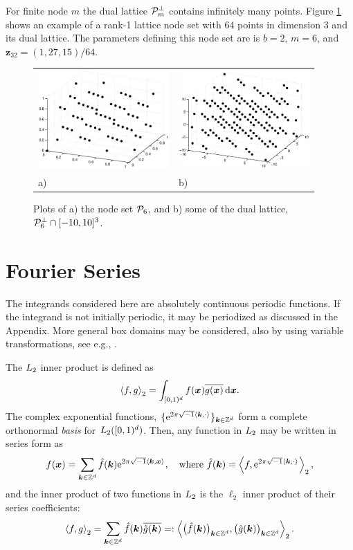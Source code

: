 \documentclass[graybox]{svmult}
\newcommand{\Z}{\mathbb{Z}} %
\newcommand{\bsx}{\boldsymbol{x}}    %
\newcommand{\bsz}{\boldsymbol{z}}    %
\begin{document}
For finite node $m$ the dual lattice $\mathcal{P}^{\perp}_{m}$ contains infinitely many points. Figure \ref{Latticefig} shows an example of a rank-1 lattice node set with $64$ points in dimension $3$ and its dual lattice. The parameters defining this node set are is $b=2$, $m=6$, and $\bsz_{32}=(1,27,15)/64$.
\begin{figure}[h!]
\centering
\begin{tabular}{>{\centering}p{5cm}>{\centering}p{5cm}}
\includegraphics[width=5cm]{Images/Lattice64.eps} &
\includegraphics[width=5cm]{Images/DualLattice64.eps}\tabularnewline
a) & b)
\end{tabular}
\caption{Plots of a) the node set $\mathcal{P}_6$, and b) some of the dual lattice, $\mathcal{P}_6^{\perp} \cap [-10,10]^3$.}\label{Latticefig}
\end{figure}

\section{Fourier Series}\label{secfourierseries}

The integrands considered here are absolutely continuous periodic functions. If the integrand is not initially periodic, it may be periodized as discussed in the Appendix. More general box domains may be considered, also by using variable transformations, see e.g.,  \cite{HicSloWas03a,HicSloWas03e}.

The $L_2$ inner product is defined as
\[
\ip[2]{f}{g} = \int_{\cube} f(\bsx) \overline{g(\bsx)} \, \dif \bsx.
\]
The complex exponential functions, $\{\E^{2 \pi \sqrt{-1} \ip{\bsk}{\cdot}}\}_{\bsk \in \Z^d}$ form a complete orthonormal \emph{basis} for $L_2([0,1)^d)$. Then, any function in $L_2$ may be written in series form as
\begin{equation} \label{Fourierdef}
f(\bsx) = \sum_{\bsk \in \Z^d} \hf(\bsk) \E^{2 \pi \sqrt{-1} \ip{\bsk}{\bsx}}, \quad \text{where } \hf(\bsk) = \ip[2]{f}{\E^{2 \pi \sqrt{-1} \ip{\bsk}{\cdot}}},
\end{equation}
and the inner product of two functions in $L_2$ is the $\ell_2$ inner product of their series coefficients:
\[
\ip[2]{f}{g} = \sum_{\bsk \in \Z^d} \hf(\bsk)\overline{\hg(\bsk)} =: \ip[2]{\bigl(\hf(\bsk)\bigr)_{\bsk \in \Z^d}}{\bigl ( \hg(\bsk)\bigr )_{\bsk \in \Z^d}}.
\]
\end{document}
